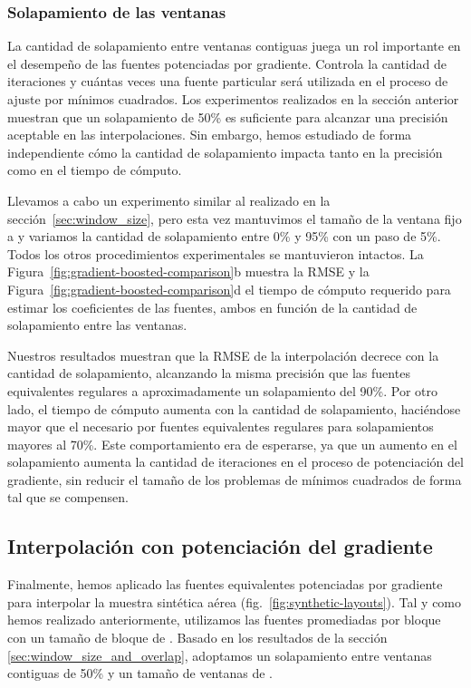 \subsubsection{Solapamiento de las ventanas}

La cantidad de solapamiento entre ventanas contiguas juega un rol importante en
el desempeño de las fuentes potenciadas por gradiente.
Controla la cantidad de iteraciones y cuántas veces una fuente particular será
utilizada en el proceso de ajuste por mínimos cuadrados.
Los experimentos realizados en la sección anterior muestran que un solapamiento
de 50\% es suficiente para alcanzar una precisión aceptable en las
interpolaciones.
Sin embargo, hemos estudiado de forma independiente cómo la cantidad de
solapamiento impacta tanto en la precisión como en el tiempo de cómputo.

Llevamos a cabo un experimento similar al realizado en la
sección~\ref{sec:window_size}, pero esta vez mantuvimos el tamaño de la ventana
fijo a \BoostOverlappingWindowSize{} y variamos la cantidad de solapamiento
entre 0\% y 95\% con un paso de 5\%.
Todos los otros procedimientos experimentales se mantuvieron intactos.
La Figura~\ref{fig:gradient-boosted-comparison}b
muestra la \ac{RMSE} y la
Figura~\ref{fig:gradient-boosted-comparison}d
el tiempo de cómputo requerido para estimar los coeficientes de las fuentes,
ambos en función de la cantidad de solapamiento entre las ventanas.

Nuestros resultados muestran que la \ac{RMSE} de la interpolación decrece con la
cantidad de solapamiento, alcanzando la misma precisión que las fuentes
equivalentes regulares a aproximadamente un solapamiento del 90\%.
Por otro lado, el tiempo de cómputo aumenta con la cantidad de solapamiento,
haciéndose mayor que el necesario por fuentes equivalentes regulares para
solapamientos mayores al 70\%.
Este comportamiento era de esperarse, ya que un aumento en el solapamiento
aumenta la cantidad de iteraciones en el proceso de potenciación del gradiente,
sin reducir el tamaño de los problemas de mínimos cuadrados de forma tal que se
compensen.


\subsection{
    Interpolación con potenciación del gradiente
}
\label{sec:gb_interpolation}

Finalmente, hemos aplicado las fuentes equivalentes potenciadas por gradiente
para interpolar la muestra sintética aérea (fig.~\ref{fig:synthetic-layouts}).
Tal y como hemos realizado anteriormente, utilizamos las fuentes promediadas
por bloque con un tamaño de bloque de \EqlBoostAirborneSpacing{}.
Basado en los resultados de la sección \ref{sec:window_size_and_overlap},
adoptamos un solapamiento entre ventanas contiguas de 50\% y un tamaño de
ventanas de \EqlBoostAirborneWindowSize{}.

